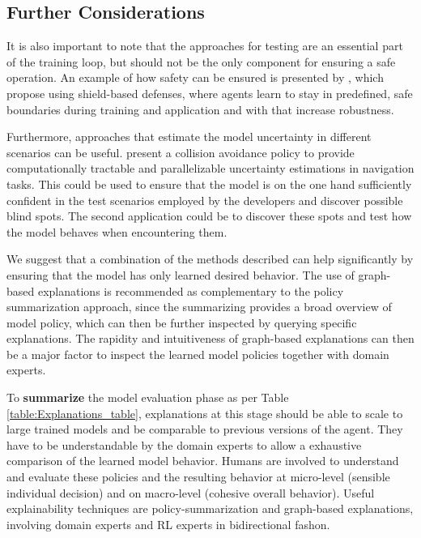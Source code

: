 \documentclass[twoside,11pt]{article}
\begin{document}
\subsection{Further Considerations}
It is also important to note that the approaches for testing are an essential part of the training loop, but should not be the only component for ensuring a safe operation. An example of how safety can be ensured is presented by \citet{XiongEtAl:2020:Robustness}, which propose using shield-based defenses, where agents learn to stay in predefined, safe boundaries during training and application and with that increase robustness.

Furthermore, approaches that estimate the model uncertainty in different scenarios can be useful. \citet{LuetjensEverettHow:2018:RLModelUncertainty} present a collision avoidance policy to provide computationally tractable and parallelizable uncertainty estimations in navigation tasks. This could be used to ensure that the model is on the one hand sufficiently confident in the test scenarios employed by the developers and discover possible blind spots. The second application could be to discover these spots and test how the model behaves when encountering them.

We suggest that a combination of the methods described can help significantly by ensuring that the model has only learned desired behavior. The use of graph-based explanations is recommended as complementary to the policy summarization approach, since the summarizing provides a broad overview of model policy, which can then be further inspected by querying specific explanations. The rapidity and intuitiveness of graph-based explanations can then be a major factor to inspect the learned model policies together with domain experts.


\noindent To \textbf{summarize} the model evaluation phase as per Table \ref{table:Explanations_table}, explanations at this stage should be able to scale to large trained models and be comparable to previous versions of the agent. They have to be understandable by the domain experts to allow a exhaustive comparison of the learned model behavior. Humans are involved to understand and evaluate these policies and the resulting behavior at micro-level (sensible individual decision) and on macro-level (cohesive overall behavior). Useful explainability techniques are policy-summarization and graph-based explanations, involving domain experts and RL experts in bidirectional fashon.
\end{document}
